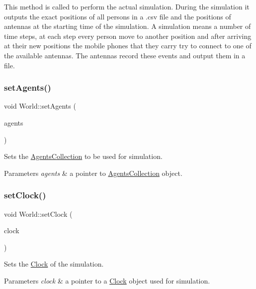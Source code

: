 This method is called to perform the actual simulation. During the simulation it outputs the exact positions of all persons in a .csv file and the positions of antennas at the starting time of the simulation. A simulation means a number of time steps, at each step every person move to another position and after arriving at their new positions the mobile phones that they carry try to connect to one of the available antennas. The antennas record these events and output them in a file. \mbox{\label{class_world_afa8e5c2943c72aa664590abbb024896b}} 
\subsubsection{\texorpdfstring{setAgents()}{setAgents()}}
{\footnotesize\ttfamily void World\+::set\+Agents (\begin{DoxyParamCaption}\item[{\mbox{\hyperlink{class_agents_collection}{Agents\+Collection}} $\ast$}]{agents }\end{DoxyParamCaption})}

Sets the \mbox{\hyperlink{class_agents_collection}{Agents\+Collection}} to be used for simulation. 
\begin{DoxyParams}{Parameters}
{\em agents} & a pointer to \mbox{\hyperlink{class_agents_collection}{Agents\+Collection}} object. \\
\hline
\end{DoxyParams}
\mbox{\label{class_world_a52ebe3eed240fe4dd37915a1dad02efd}} 
\subsubsection{\texorpdfstring{setClock()}{setClock()}}
{\footnotesize\ttfamily void World\+::set\+Clock (\begin{DoxyParamCaption}\item[{\mbox{\hyperlink{class_clock}{Clock}} $\ast$}]{clock }\end{DoxyParamCaption})}

Sets the \mbox{\hyperlink{class_clock}{Clock}} of the simulation. 
\begin{DoxyParams}{Parameters}
{\em clock} & a pointer to a \mbox{\hyperlink{class_clock}{Clock}} object used for simulation. \\
\hline
\end{DoxyParams}
\mbox{\label{class_world_a9dc80487d5c2d1d4f2af0c1d7f015204}} 

